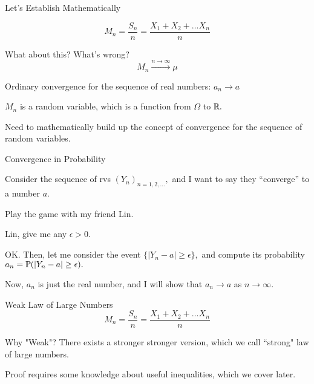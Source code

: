 \begin{frame}{Let's Establish Mathematically}

$$
M_n = \frac{S_n}{n} = \frac{X_1 + X_2+ \ldots X_n}{n}
$$

\plitemsep 0.1in
\bci 
\item<2-> What about this? What's wrong?
$$
M_n \xrightarrow{n \rightarrow \infty} \mu
$$

\item<3-> Ordinary convergence for the sequence of real numbers: $a_n \rightarrow a$



\item<5-> $M_n$ is a random variable, which is a function from $\Omega$ to ${\mathbb R}.$

\item<6-> Need to mathematically build up the concept of convergence for the sequence of random variables.

\eci 

\end{frame}

\begin{frame}{Convergence in Probability}

\plitemsep 0.1in

\bci 
\item<1-> Consider the sequence of rvs $(Y_n)_{n=1, 2, \ldots},$ and I want to say they ``converge'' to a number $a.$

\item<2-> Play the game with my friend Lin. 
\bci
\item<3-> Lin, give me any $\epsilon>0.$ 
\item<4-> OK. Then, let me consider the event $\{|Y_n -a| \geq \epsilon \},$ and compute its probability $a_n = \mathbb{P}( |Y_n -a| \geq \epsilon ).$
\item<5-> Now, $a_n$ is just the real number, and I will show that $a_n \rightarrow a$ as $n \rightarrow \infty.$

\eci
\eci 
\end{frame}

\begin{frame}{Weak Law of Large Numbers}
$$
M_n = \frac{S_n}{n} = \frac{X_1 + X_2+ \ldots X_n}{n}
$$

 \plitemsep 0.1in
 \bci 
 \item<3-> Why "Weak"? There exists a stronger stronger version, which we call ``strong" law of large numbers.

\item<4-> Proof requires some knowledge about useful inequalities, which we cover later. 
 \eci 
\end{frame}

